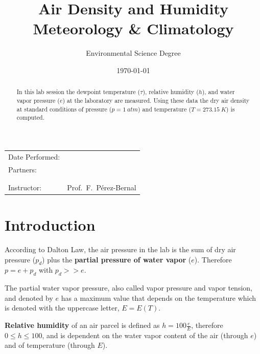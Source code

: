 \documentclass{article}
\title{\textbf{Air Density and Humidity} \\ Meteorology
  \& Climatology} %
\author{Environmental Science Degree} %
\date{\today} %
\begin{document}
\maketitle %

\begin{center}
\begin{tabular}{l r}
Date Performed: & \underline{\hspace{3cm}}  \\ %
Partners: & \underline{\hspace{6cm}} \\ %
& \underline{\hspace{6cm}} \\
& \underline{\hspace{6cm}} \\
Instructor: & Prof.~F.~Pérez-Bernal %
\end{tabular}
\end{center}

\begin{abstract}
  In this lab session the dewpoint temperature ($\tau$), relative humidity ($h$),
  and water vapor pressure ($e$) at the laboratory are measured.
  Using these data the dry air density at standard conditions of
  pressure ($p = \SI{1}{atm}$) and temperature ($T= \SI{273.15}{K}$) is
  computed.
\end{abstract}

\section{Introduction}
According to Dalton Law, the air pressure in the lab is the sum of
dry air pressure ($p_d$) plus the \textbf{partial pressure of water vapor}
($e$). Therefore $p = e + p_d$ with $p_d>>e$.

The partial water vapor pressure, also called vapor pressure and vapor
tension, and denoted by $e$ has a maximum value that depends on the
temperature which is denoted with the uppercase letter, $E = E(T)$.

\textbf{Relative humidity} of an air parcel is defined as $h = 100\frac{e}{E}$,
therefore $0\le h\le 100$, and is dependent on the water vapor content of
the air (through $e$) and of temperature (through $E$).
\end{document}
